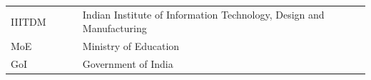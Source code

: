 
\abbreviations
 
\begin{tabular}{p{0.2\linewidth}p{0.8\linewidth}}
	IIITDM & Indian Institute of Information Technology, Design and Manufacturing \\
	MoE & Ministry of Education \\
	GoI & Government of India \\
\end{tabular}
